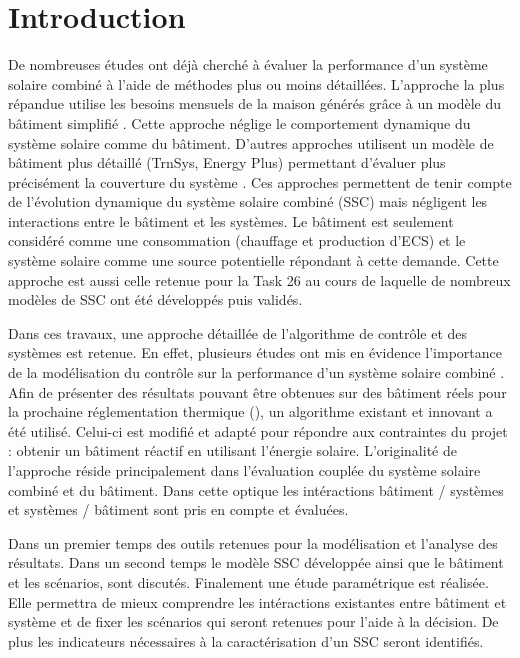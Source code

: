 


\section{Introduction} %
\label{sec:introduction}
De nombreuses études ont déjà cherché à évaluer la performance d’un système solaire
combiné à l’aide de méthodes plus ou moins détaillées. L’approche la plus répandue utilise
les besoins mensuels de la maison générés grâce à un modèle du bâtiment simplifié
\parencite{Raffenel2009657,Martinopoulos2014130}. Cette approche néglige le comportement dynamique du système
solaire comme du bâtiment. D’autres approches utilisent un modèle de bâtiment plus
détaillé (TrnSys, Energy Plus) permettant d’évaluer plus précisément la couverture du
système \parencite{Glembin2012601}. Ces approches permettent de tenir compte de l’évolution dynamique du système
solaire combiné (SSC) mais négligent les interactions entre le bâtiment et les systèmes. Le
bâtiment est seulement considéré comme une consommation (chauffage et production d’ECS) et
le système solaire comme une source potentielle répondant à cette demande. Cette approche
est aussi celle retenue pour la Task 26 \parencite{Task262003} au cours de laquelle de nombreux modèles
de SSC ont été développés puis validés.

Dans ces travaux, une approche détaillée de l’algorithme de contrôle et des systèmes est retenue. En
effet, plusieurs études ont mis en évidence l’importance de la modélisation du contrôle
sur la performance d’un système solaire combiné \parencite{Kicsiny20123489,Huang20123278}.
Afin de présenter des résultats pouvant être obtenues sur des bâtiment réels pour la
prochaine réglementation thermique (), un algorithme existant et innovant
a été utilisé. Celui-ci est modifié et adapté pour répondre aux contraintes du projet : obtenir
un bâtiment réactif en utilisant l’énergie solaire.
L’originalité de l’approche réside principalement dans l’évaluation couplée du système
solaire combiné et du bâtiment. Dans cette optique les intéractions bâtiment / systèmes et
systèmes / bâtiment sont pris en compte et évaluées.

Dans un premier temps des outils retenues pour la modélisation et l’analyse des résultats.
Dans un second temps le modèle SSC développée ainsi que le bâtiment et les scénarios, sont
discutés. Finalement une étude paramétrique est réalisée. Elle permettra de mieux
comprendre les intéractions existantes entre bâtiment et système et de fixer les scénarios
qui seront retenues pour l’aide à la décision. De plus les indicateurs nécessaires à la
caractérisation d’un SSC seront identifiés.


